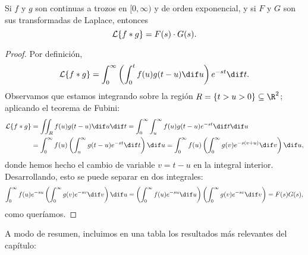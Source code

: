 \documentclass[../ecuaciones_diferenciales.tex]{subfiles}
\begin{document}
\begin{theorem}
	Si \(f\) y \(g\) son continuas a trozos en \([0,\infty)\) y de orden
	exponencial, y si \(F\) y \(G\) son sus transformadas de Laplace, entonces
	\[\mathcal{L}\{f \ast g\} = F(s) \cdot G(s).\]
	\begin{proof}
		Por definición,
		\[\L\{f \ast g\} = \int_0^\infty \left( \int_0^t f(u)g(t-u) \dif u \right)
			e^{-st} \dif t.\]
		Observamos que estamos integrando sobre la región \(R = \{t > u > 0\} \subseteq
		\R^2\); aplicando el teorema de Fubini:
		\begin{align*}
			\L\{f \ast g\}
			 & = \iint_R f(u) g(t-u) \dif u \dif t
			= \int_0^\infty \int_u^\infty f(u)g(t-u)e^{-st} \dif t \dif u            \\
			 & = \int_0^\infty f(u) \left(\int_u^\infty g(t-u)e^{-st} \dif t \right)
			\dif u = \int_0^\infty f(u) \left( \int_0^\infty g(v)e^{-s(v+u)} \dif v
			\right) \dif u,
		\end{align*}
		donde hemos hecho el cambio de variable \(v = t-u\) en la integral
		interior. Desarrollando, esto se puede separar en dos integrales:
		\[\int_0^\infty f(u) e^{-su} \left( \int_0^\infty g(v)e^{-sv} \dif v \right) \dif u
			= \left( \int_0^\infty f(u)e^{-su} \dif u \right)
			\left( \int_0^\infty g(v)e^{-sv} \dif v \right)
			= F(s) G(s),\]
		como queríamos.
	\end{proof}
\end{theorem}

A modo de resumen, incluimos en una tabla los resultados más relevantes del
capítulo:
\end{document}
